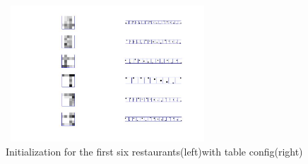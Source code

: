 \documentclass{article}
\begin{document}
\begin{spacing}{1.1}
\begin{figure}[h]
\begin{minipage}[b]{0.5\textwidth}
    \label{fig:by:table} 
  \end{minipage}%
  \begin{minipage}[b]{0.5\textwidth} 
    \centering 
    \includegraphics[width=3in,height=2in]{greed_init.jpg} 
    \caption{Initialization for the first six restaurants(left)with table config(right)}
    \label{fig:by:table}  
   \end{minipage}%
\end{figure}



\end{spacing}
\end{document}
